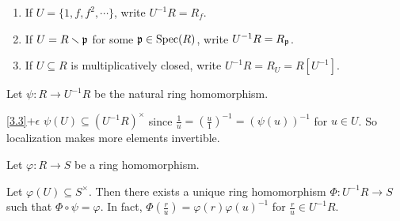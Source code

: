\begin{notation}\label{3.4}
    \begin{enumerate}
        \item If $U = \{1,f,f^2,\cdots\}$, write $U^{-1}R = R_f$.
        \item If $U = R \smallsetminus \mathfrak{p}$ for some $\mathfrak{p} \in \operatorname{Spec}(R)$, write $U^{-1}R = R_{\mathfrak{p}}$.
        \item If $U \subseteq R$ is multiplicatively closed, write $U^{-1}R = R_U = R[U^{-1}]$.
    \end{enumerate}
\end{notation}

\noindent Let $\psi: R \to U^{-1}R$ be the natural ring homomorphism.

\begin{customrecall}{\ref{3.3}+$\epsilon$} \label{3.3Plus}
    $\psi(U) \subseteq (U^{-1}R)^{\times}$ since $\frac{1}{u} = (\frac{u}{1})^{-1} = (\psi(u))^{-1}$ for $u \in U$. So localization makes more elements invertible.
\end{customrecall}

\noindent Let $\varphi: R \to S$ be a ring homomorphism. 

\begin{proposition}\label{3.5}
    Let $\varphi(U) \subseteq S^{\times}$. Then there exists a unique ring homomorphism $\Phi:U^{-1}R \to S$ such that $\Phi \circ \psi = \varphi$. In fact, $\Phi(\frac{r}{u}) = \varphi(r)\varphi(u)^{-1}$ for $\frac{r}{u} \in U^{-1}R$.
    \begin{center}
        \ \ \ \ \ \ \ \ \ \ \ \
    \end{center}
\end{proposition}

